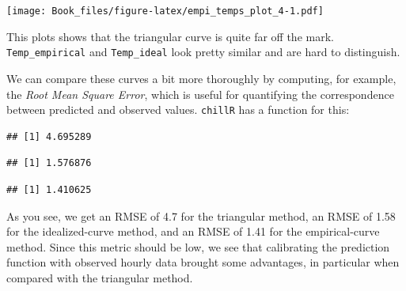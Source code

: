 \documentclass[
]{book}
\newenvironment{Shaded}{\begin{snugshade}}{\end{snugshade}}
\newcommand{\CommentTok}[1]{\textcolor[rgb]{0.56,0.35,0.01}{\textit{#1}}}
\newcommand{\KeywordTok}[1]{\textcolor[rgb]{0.13,0.29,0.53}{\textbf{#1}}}
\newcommand{\NormalTok}[1]{#1}
\newcommand{\OperatorTok}[1]{\textcolor[rgb]{0.81,0.36,0.00}{\textbf{#1}}}
\begin{document}
\texttt{[image: Book\_files/figure-latex/empi\_temps\_plot\_4-1.pdf]}

This plots shows that the triangular curve is quite far off the mark. \texttt{Temp\_empirical} and \texttt{Temp\_ideal} look pretty similar and are hard to distinguish.

We can compare these curves a bit more thoroughly by computing, for example, the \emph{Root Mean Square Error}, which is useful for quantifying the correspondence between predicted and observed values. \texttt{chillR} has a function for this:

\begin{Shaded}
\end{Shaded}

\begin{verbatim}
## [1] 4.695289
\end{verbatim}

\begin{Shaded}
\end{Shaded}

\begin{verbatim}
## [1] 1.576876
\end{verbatim}

\begin{Shaded}
\end{Shaded}

\begin{verbatim}
## [1] 1.410625
\end{verbatim}

As you see, we get an RMSE of 4.7 for the triangular method, an RMSE of 1.58 for the idealized-curve method, and an RMSE of 1.41 for the empirical-curve method. Since this metric should be low, we see that calibrating the prediction function with observed hourly data brought some advantages, in particular when compared with the triangular method.
\end{document}
